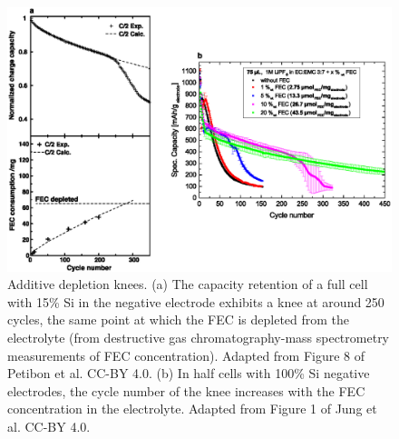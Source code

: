 \documentclass[journal=jpclcd,manuscript=article]{achemso}
\begin{document}
\begin{figure}[ht]
\centering
\includegraphics[scale = 0.9]{figures/fec_depletion.eps}
\caption{Additive depletion knees.
(a) The capacity retention of a full cell with 15\% Si in the negative electrode exhibits a knee at around 250 cycles, the same point at which the FEC is depleted from the electrolyte (from destructive gas chromatography-mass spectrometry measurements of FEC concentration). Adapted from Figure 8 of Petibon et al.\cite{petibon_studies_2016} CC-BY 4.0.
(b) In half cells with 100\% Si negative electrodes, the cycle number of the knee increases with the FEC concentration in the electrolyte. Adapted from Figure 1 of Jung et al.\cite{jung_consumption_2016} CC-BY 4.0.}  
\label{fig:fec_knee}
\end{figure}
\end{document}
